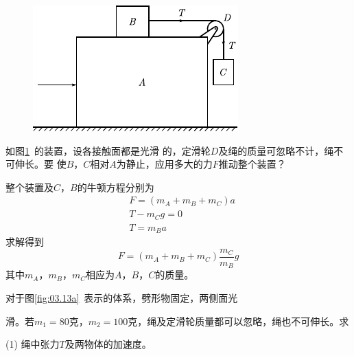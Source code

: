 \begin{figure}
    \centering
    \includegraphics{figure/fig03.12}
    \caption{}
    \label{fig:03.12}
\end{figure}
\example 如图\ref{fig:03.12}~的装置，设各接触面都是光滑
的，定滑轮$ D $及绳的质量可忽略不计，绳不可伸长。要
使$ B $，$ C $相对$ A $为静止，应用多大的力$ F $推动整个装置？

\solution 整个装置及$ C $，$ B $的牛顿方程分别为
\begin{align*}
	&F = ( m _{A} + m _ { B } + m _ { C } ) a \\[-0.5em]
	&T - m _ { C } g = 0 \\[-0.5em]
	&T = m _ { B } a
\end{align*}
求解得到\vspace{-1.56em}
\begin{equation*}
	F = ( m _ { A } + m _ { B } + m _ { C } ) \frac { m _ { C } } { m _ { B } } g
\end{equation*}
其中$ m_{A} $，$ m_{B} $，$ m_{C} $相应为$ A $，$ B $，$ C $的质量。


\example 对于图\ref{fig:03.13a}~表示的体系，劈形物固定，两侧面光

\noindent 滑。若$  m _ { 1 } = 8 0 \text{克} $，$ m _ { 2 } = 1 0 0 \text{克} $，绳及定滑轮质量都可以忽略，绳也不可伸长。求

(1) 绳中张力$ T $及两物体的加速度。


